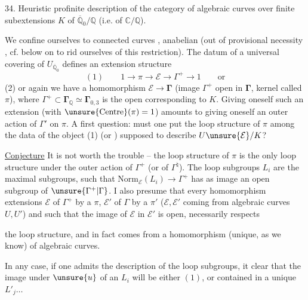 34. Heuristic profinite description of the category
of algebraic curves  over  finite
subextensions $K$ of $\overline{\mathbb Q}_0/\mathbb Q$ (i.e. of $\mathbb C/\mathbb Q$).

We confine ourselves to  connected curves , anabelian
(out of provisional necessity \unsure{!}, cf. below on  to
rid ourselves of this restriction). The datum of
a universal covering of  $U_{\overline{\mathbb Q}_0}$ defines an
extension structure
\[
(1)\qquad 1\longrightarrow\pi\longrightarrow\mathcal E\longrightarrow\Gamma^{+}\longrightarrow1\qquad\text{or}
\]
(2) or again we have a homomorphism $\mathcal E\longrightarrow\boldsymbol{\Gamma}$
(image $\Gamma^{+}$ open in $\boldsymbol{\Gamma}$,
kernel called $\pi$),
where $\Gamma^{+}\subset\boldsymbol{\Gamma}_{\mathbb Q}\simeq\boldsymbol{\Gamma}_{0,3}$ is the open 
corresponding to $K$. Giving oneself such an
extension (with $\unsure{\mathrm{Centre}}(\pi)=1$) amounts to
giving oneself an outer action of $\Gamma'$ on $\pi$.
A first question: must one put the
loop structure of $\pi$ among the  data  of
the object (1) (or ) supposed to describe $U\unsure{\mathcal E}/K$?

\uline{Conjecture} It is not worth the trouble -- the loop structure
of $\pi$ is the only loop structure 
under the outer action of $\Gamma^{+}$ (or of $\Gamma^{\natural}$). The
loop subgroups $L_i$ are the maximal
subgroups, such that $\mathrm{Norm}_{\mathcal E}(L_i)\longrightarrow\Gamma^{+}$ has
as image an open subgroup of $\unsure{\Gamma^{+}|\Gamma}$.
I
also presume that every homomorphism  extensions
$\mathcal E$ of $\Gamma^{+}$ by a $\pi$, $\mathcal E'$ of $\Gamma$ by a $\pi'$
($\mathcal E,\mathcal E'$ coming from algebraic curves $U,U'$) and such
that the image of $\mathcal E$ in $\mathcal E'$ is open, necessarily respects

the loop structure, and in fact
comes from a homomorphism (unique, as we know) of algebraic
curves.

In any case, if one admits the description of the
loop subgroups, it  clear that the image under
$\unsure{u}$ of an $L_i$ will be either $(1)$, or contained
in a unique $L'_j\ldots$

